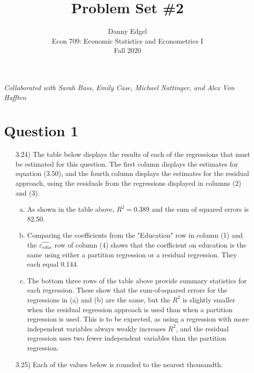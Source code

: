 \documentclass{article}
\begin{document}
\title{	Problem Set \#2 }
\author{ 	Danny Edgel 										\\ 
			Econ 709: Economic Statistics and Econometrics I	\\
			Fall 2020											\\
		}
\maketitle\thispagestyle{empty}


\noindent\textit{Collaborated with Sarah Bass, Emily Case, Michael Nattinger, and Alex Von Hafften}


\section*{Question 1}
\begin{itemize}
	\item[3.24)] The table below displays the results of each of the regressions that must be estimated for this question. The first column displays the estimates for equation (3.50), and the fourth column displays the estimates for the residual approach, using the residuals from the regressions displayed in columns (2) and (3).
		\begin{center}
			
		\end{center}
		\begin{enumerate}[(a)]
			\item As shown in the table above, ${R^2=0.389}$ and the sum of squared errors is 82.50.
			
			\item Comparing the coefficients from the "Education" row in column (1) and the $\hat{\varepsilon_{educ}}$ row of column (4) shows that the coefficient on education is the same using either a partition regression or a residual regression. They each equal 0.144.
			
			\item The bottom three rows of the table above provide summary statistics for each regression. These show that the sum-of-squared errors for the regressions in (a) and (b) are the same, but the $R^2$ is slightly smaller when the residual regression approach is used than when a partition regression is used. This is to be expected, as using a regression with more independent variables always weakly increases $R^2$, and the residual regression uses two fewer independent variables than the partition regression.
			
		\end{enumerate}
	
	\item[3.25)] Each of the values below is rounded to the nearest thousandth.
		
	
\end{itemize}
\end{document}
